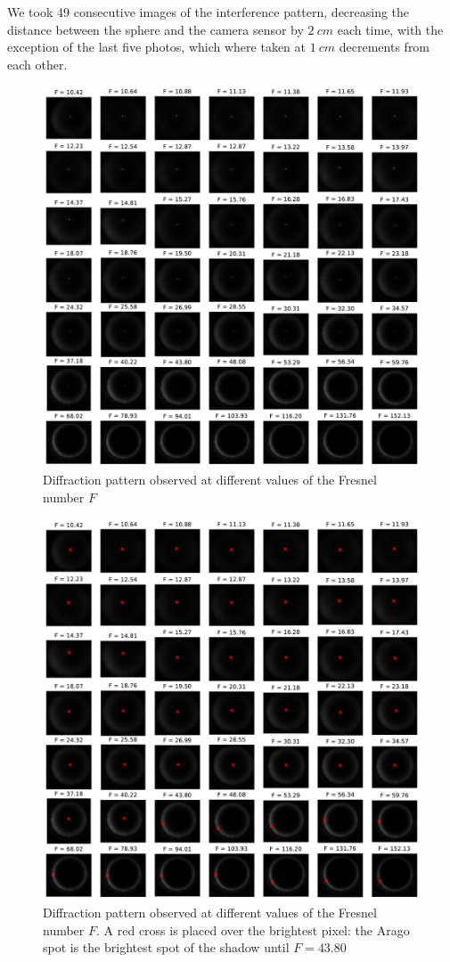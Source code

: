 \documentclass[11pt,a4paper]{article}
\begin{document}
We took 49 consecutive images of the interference pattern, decreasing the distance between the sphere and the camera sensor by \(\SI{2}{cm}\) each time, with the exception of the last five photos, which where taken at \(\SI{1}{cm}\) decrements from each other.

\begin{figure}[H]
    \centering
    \includegraphics[width=0.8\linewidth]{images/Fresnel-grid.pdf}
    \caption{Diffraction pattern observed at different values of the Fresnel number \(F\)}
    \label{fig:fresnel-number-grid}
\end{figure}

\begin{figure}[H]
    \centering
    \includegraphics[width=0.35\linewidth]{images/Fresnel-grid-brightest-spot.pdf}
    \caption{Diffraction pattern observed at different values of the Fresnel number \(F\). A red cross is placed over the brightest pixel: the Arago spot is the brightest spot of the shadow until \(F = 43.80\)}
    \label{fig:fresnel-grid-highlighted-spot}
\end{figure}
\end{document}
